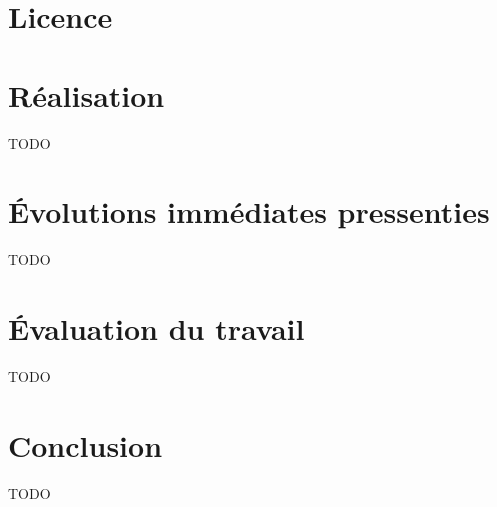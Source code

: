 \documentclass[12pt]{report}
\begin{document}

	\setcounter{page}{1}

	\chapter*{Licence}
	\clearpage

	\renewcommand{\thepage}{\roman{page}}

	\tableofcontents
	\clearpage

	\renewcommand{\thepage}{\arabic{page}}
	
	\printglossary[type=\acronymtype,title=Acronymes]
	\printglossary[title=Glossaire]

	

    

	

    

	\chapter{Réalisation}
	\label{ch:implementation}

		TODO

	\chapter{Évolutions immédiates pressenties}
	\label{ch:next-steps}

		TODO

	\chapter{Évaluation du travail}
	\label{ch:auto-critic}

		TODO

	\chapter{Conclusion}
	\label{ch:conclusion}

		TODO
		
	

	\printbibliography

\end{document}
